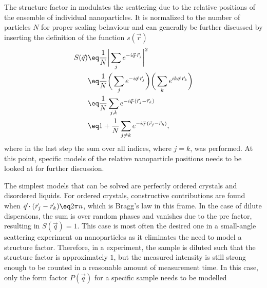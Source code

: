 \documentclass[\main/dresen_thesis.tex]{subfiles}
\begin{document}
    The structure factor in  modulates the scattering due to the relative positions of the ensemble of individual nanoparticles.
    It is normalized to the number of particles $N$ for proper scaling behaviour and can generally be further discussed by inserting the definition of the function $s(\vec{r})$
    \begin{align}
      \begin{split}
        S(\vec{q}) &\eq \frac{1}{N} \bigg| \sum_j  e^{-i\vec{q} \cdot \vec{r}_j} \bigg|^2\\
        &\eq \frac{1}{N}  \bigg( \sum_j  e^{-i\vec{q} \cdot \vec{r}_j} \bigg) \bigg( \sum_k  e^{i k\vec{q} \cdot \vec{r}_k} \bigg)\\
        &\eq \frac{1}{N}  \sum_{j, k}  e^{-i\vec{q} \cdot (\vec{r}_j - \vec{r}_k) }\\
        &\eq 1 + \frac{1}{N}  \sum_{j \neq k}  e^{-i\vec{q} \cdot (\vec{r}_j - \vec{r}_k)},\label{eq:theoreticalBackground:scattering:scatteringTheory:structureFactor}
      \end{split}
    \end{align}
    where in the last step the sum over all indices, where $j=k$, was performed.
    At this point, specific models of the relative nanoparticle positions needs to be looked at for further discussion.

    The simplest models that can be solved are perfectly ordered crystals and disordered liquids.
    For ordered crystals, constructive contributions are found when $\vec{q} \cdot (\vec{r}_j - \vec{r}_k) \eq 2 \pi n$, which is Bragg's law in this frame.
    In the case of dilute dispersions, the sum is over random phases and vanishes due to the pre factor, resulting in $S(\vec{q}) = 1$.
    This case is most often the desired one in a small-angle scattering experiment on nanoparticles as it eliminates the need to model a structure factor.
    Therefore, in a experiment, the sample is diluted such that the structure factor is approximately $1$, but the measured intensity is still strong enough to be counted in a reasonable amount of measurement time.
    In this case, only the form factor $P(\vec{q})$ for a specific sample needs to be modelled
\end{document}
